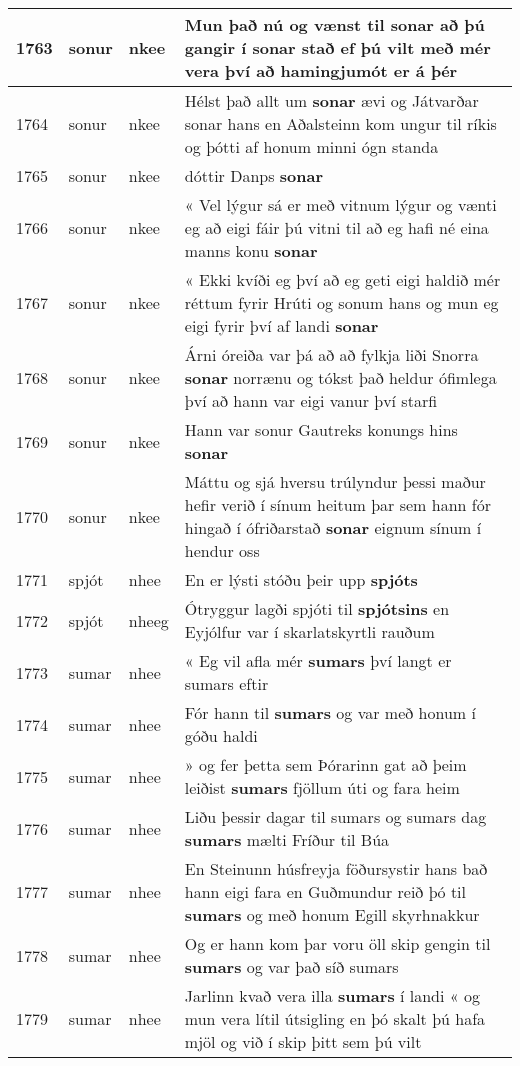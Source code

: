 \documentclass{article}
\begin{document}
\begin{longtable}{p{1cm}|p{1cm}|p{1cm}|p{13cm}}
\hline
1763&sonur&nkee&Mun það nú og vænst til \textbf{sonar} að þú gangir í sonar stað ef þú vilt með mér vera því að hamingjumót er á þér\\
\hline
1764&sonur&nkee&Hélst það allt um \textbf{sonar} ævi og Játvarðar sonar hans en Aðalsteinn kom ungur til ríkis og þótti af honum minni ógn standa\\
\hline
1765&sonur&nkee&dóttir Danps \textbf{sonar} \\
\hline
1766&sonur&nkee&« Vel lýgur sá er með vitnum lýgur og vænti eg að eigi fáir þú vitni til að eg hafi né eina manns konu \textbf{sonar} \\
\hline
1767&sonur&nkee&« Ekki kvíði eg því að eg geti eigi haldið mér réttum fyrir Hrúti og sonum hans og mun eg eigi fyrir því af landi \textbf{sonar} \\
\hline
1768&sonur&nkee&Árni óreiða var þá að að fylkja liði Snorra \textbf{sonar} norrænu og tókst það heldur ófimlega því að hann var eigi vanur því starfi\\
\hline
1769&sonur&nkee&Hann var sonur Gautreks konungs hins \textbf{sonar} \\
\hline
1770&sonur&nkee&Máttu og sjá hversu trúlyndur þessi maður hefir verið í sínum heitum þar sem hann fór hingað í ófriðarstað \textbf{sonar} eignum sínum í hendur oss\\
\hline
1771&spjót&nhee&En er lýsti stóðu þeir upp \textbf{spjóts} \\
\hline
1772&spjót&nheeg&Ótryggur lagði spjóti til \textbf{spjótsins} en Eyjólfur var í skarlatskyrtli rauðum\\
\hline
1773&sumar&nhee&« Eg vil afla mér \textbf{sumars} því langt er sumars eftir\\
\hline
1774&sumar&nhee&Fór hann til \textbf{sumars} og var með honum í góðu haldi\\
\hline
1775&sumar&nhee&» og fer þetta sem Þórarinn gat að þeim leiðist \textbf{sumars} fjöllum úti og fara heim\\
\hline
1776&sumar&nhee&Liðu þessir dagar til sumars og sumars dag \textbf{sumars} mælti Fríður til Búa\\
\hline
1777&sumar&nhee&En Steinunn húsfreyja föðursystir hans bað hann eigi fara en Guðmundur reið þó til \textbf{sumars} og með honum Egill skyrhnakkur\\
\hline
1778&sumar&nhee&Og er hann kom þar voru öll skip gengin til \textbf{sumars} og var það síð sumars\\
\hline
1779&sumar&nhee&Jarlinn kvað vera illa \textbf{sumars} í landi « og mun vera lítil útsigling en þó skalt þú hafa mjöl og við í skip þitt sem þú vilt\\

\end{longtable}
\end{document}
